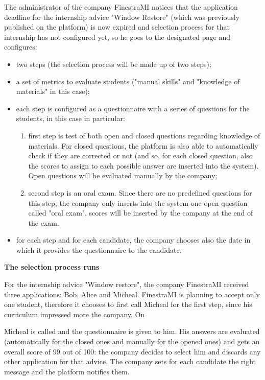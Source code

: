 		\begin{flushleft}
			The administrator of the company FinestraMI notices that the application deadline for the internship advice "Window Restore" (which was previously published on the platform) is now expired and selection process for that internship has not configured yet, so he goes to the designated page and configures:
			\begin{itemize}
				\item two steps (the selection process will be made up of two steps);
				\item a set of metrics to evaluate students ("manual skills" and "knowledge of materials" in this case);
				\item each step is configured as a questionnaire with a series of questions for the students, in this case in particular:
					\begin{enumerate}
						\item first step is test of both open and closed questions regarding knowledge of materials. For closed questions, the platform is also able to automatically check if they are corrected or not (and so, for each closed question, also the scores to assign to each possible answer are inserted into the system). Open questions will be evaluated manually by the company;
						\item second step is an oral exam. Since there are no predefined questions for this step, the company only inserts into the system one open question called "oral exam", scores will be inserted by the company at the end of the exam.
					\end{enumerate}
				\item for each step and for each candidate, the company chooses also the date in which it provides the questionnaire to the candidate.
			\end{itemize}
		\end{flushleft}
		\textbf{The selection process runs}
		\begin{flushleft}
			For the internship advice "Window restore", the company FinestraMI received three applications: Bob, Alice and Micheal. FinestraMI is planning to accept only one student, therefore it chooses to first call Micheal for the first step, since his curriculum impressed more the company. On \date{23/11/2024} Micheal is called and the questionnaire is given to him. His answers are evaluated (automatically for the closed ones and manually for the opened ones) and gets an overall score of 99 out of 100: the company decides to select him and discards any other application for that advice. The company sets for each candidate the right message and the platform notifies them. 
		\end{flushleft}

